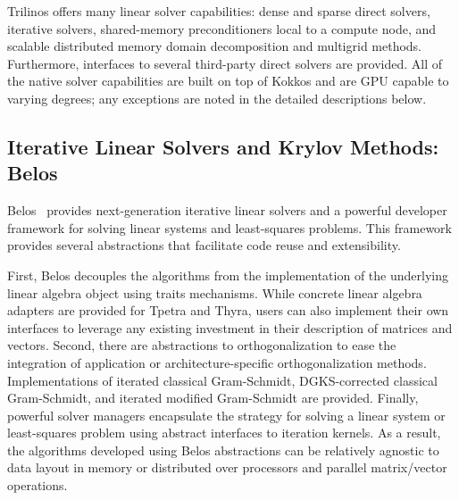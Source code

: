 
%

Trilinos offers many linear solver capabilities: dense and sparse direct solvers, iterative solvers, shared-memory preconditioners local to a compute node, and scalable distributed memory domain decomposition and multigrid methods. Furthermore, interfaces to several third-party direct solvers are provided. All of the native solver capabilities are built on top of Kokkos and are GPU capable to varying degrees; any exceptions are noted in the detailed descriptions below.




\subsection{Iterative Linear Solvers and Krylov Methods: Belos}

Belos~\cite{Bavier2012a} provides next-generation iterative linear solvers and a powerful developer framework for solving linear systems and least-squares problems. This framework provides several abstractions that facilitate code reuse and extensibility.

First, Belos decouples the algorithms from the implementation of the underlying linear algebra object using traits mechanisms.  While concrete linear algebra adapters are provided for Tpetra and Thyra, users can also implement their own interfaces to leverage any existing investment in their description of matrices and vectors.  Second, there are abstractions to orthogonalization to ease the integration of application or architecture-specific orthogonalization methods. Implementations of iterated classical Gram-Schmidt, DGKS-corrected classical Gram-Schmidt, and iterated modified Gram-Schmidt are provided.  Finally, powerful solver managers encapsulate the strategy for solving a linear system or least-squares problem using abstract interfaces to iteration kernels.  As a result, the algorithms developed using Belos abstractions can be relatively agnostic to data layout in memory or distributed over processors and parallel matrix/vector operations.

